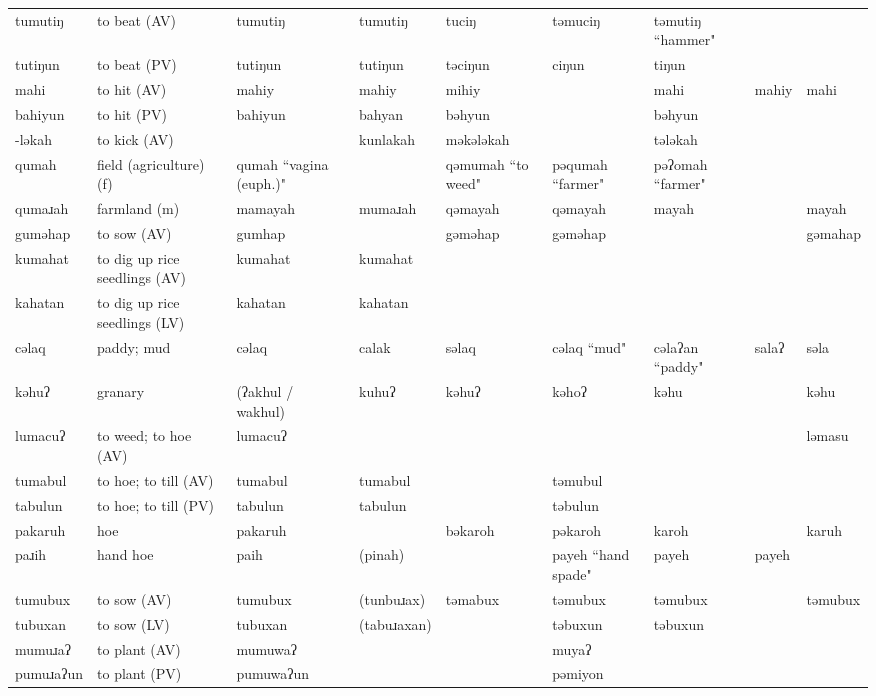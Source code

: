 \begin{landscape}
\begin{longtable}{*{9}{>{\raggedright\arraybackslash}p{}}}
\text{*}tumutiŋ & to beat (AV) & tumutiŋ & tumutiŋ & tuciŋ & təmuciŋ & təmutiŋ ``hammer" &  & \\
\text{*}tutiŋun & to beat (PV) & tutiŋun & tutiŋun & təciŋun & ciŋun & tiŋun &  & \\
\text{*}mahi & to hit (AV) & mahiy & mahiy & mihiy &  & mahi & mahiy & mahi\\
\text{*}bahiyun & to hit (PV) & bahiyun & bahyan & bəhyun &  & bəhyun &  & \\
\text{*}-ləkah & to kick (AV) &  & kunlakah & məkələkah &  & tələkah &  & \\
\text{*}qumah & field (agriculture) (f) & qumah ``vagina (euph.)" &  & qəmumah ``to weed" & pəqumah ``farmer" & pəʔomah ``farmer" &  & \\
\text{*}qumaɹah & farmland (m) & mamayah & mumaɹah & qəmayah & qəmayah & mayah &  & mayah\\
\text{*}guməhap & to sow (AV) & gumhap &  & gəməhap & gəməhap &  &  & gəmahap\\
\text{*}kumahat & to dig up rice seedlings (AV) & kumahat & kumahat &  &  &  &  & \\
\text{*}kahatan & to dig up rice seedlings (LV) & kahatan & kahatan &  &  &  &  & \\
\text{*}cəlaq & paddy; mud & cəlaq & calak & səlaq & cəlaq ``mud" & cəlaʔan ``paddy" & salaʔ & səla\\
\text{*}kəhuʔ & granary & (ʔakhul / wakhul) & kuhuʔ & kəhuʔ & kəhoʔ & kəhu &  & kəhu\\
\text{*}lumacuʔ & to weed; to hoe (AV) & lumacuʔ &  &  &  &  &  & ləmasu\\
\text{*}tumabul & to hoe; to till (AV) & tumabul & tumabul &  & təmubul &  &  & \\
\text{*}tabulun & to hoe; to till (PV) & tabulun & tabulun &  & təbulun &  &  & \\
\text{*}pakaruh & hoe & pakaruh &  & bəkaroh & pəkaroh & karoh &  & karuh\\
\text{*}paɹih & hand hoe & paih & (pinah) &  & payeh ``hand spade" & payeh & payeh & \\
\text{*}tumubux & to sow (AV) & tumubux & (tunbuɹax) & təmabux & təmubux & təmubux &  & təmubux\\
\text{*}tubuxan & to sow (LV) & tubuxan & (tabuɹaxan) &  & təbuxun & təbuxun &  & \\
\text{*}mumuɹaʔ & to plant (AV) & mumuwaʔ &  &  & muyaʔ &  &  & \\
\text{*}pumuɹaʔun & to plant (PV) & pumuwaʔun &  &  & pəmiyon &  &  & \\

\end{longtable}
\end{landscape}
